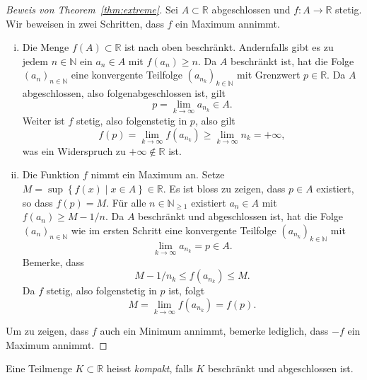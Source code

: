 \documentclass[../main.tex]{subfiles}
\begin{document}
\begin{proof}[Beweis von Theorem~\ref{thm:extreme}]
  Sei $A \subset \mathbb{R}$ abgeschlossen
  und $f \colon A \to \mathbb{R}$ stetig.
  Wir beweisen in zwei Schritten, dass $f$
  ein Maximum annimmt.
  \begin{enumerate}[(i)]
    \item Die Menge $f(A) \subset \mathbb{R}$ ist 
      nach oben beschränkt.
      Andernfalls gibt es zu jedem $n \in \mathbb{N}$ 
      ein $a_n \in A$ mit $f(a_n) \geq n$.
      Da $A$ beschränkt ist, hat
      die Folge ${(a_{n})}_{n \in \mathbb{N}}$ eine
      konvergente Teilfolge
      ${(a_{n_k})}_{k \in \mathbb{N}}$ mit
      Grenzwert $p \in \mathbb{R}$.
      Da $A$ abgeschlossen, also folgenabgeschlossen
      ist, gilt
      \[
        p = \lim_{k \to \infty}a_{n_k} \in A.
      \]
      Weiter ist $f$ stetig, also folgenstetig
      in $p$, also gilt
      \[
        f(p) = \lim_{k \to \infty} f(a_{n_k})
        \geq \lim_{k \to \infty} n_k = +\infty,
      \]
      was ein Widerspruch zu $+\infty \notin \mathbb{R}$ ist.
    \item Die Funktion $f$ nimmt ein Maximum an.
      Setze $
        M = \sup \left\{f(x) \mid x \in A\right\} \in \mathbb{R}
        $.
      Es ist bloss zu zeigen, dass $p \in A$ existiert,
      so dass $f(p) = M$.
      Für alle $n \in \mathbb{N}_{\geq 1}$ existiert
      $a_n \in A$ mit $f(a_n) \geq M - 1/n$.
      Da $A$ beschränkt und abgeschlossen ist,
      hat die Folge
      ${(a_{n})}_{n \in \mathbb{N}}$ wie im
      ersten Schritt eine konvergente
      Teilfolge ${(a_{n_k})}_{k \in \mathbb{N}}$ mit
      \[
        \lim_{k \to \infty} a_{n_k}= p \in A.
      \]
      Bemerke, dass
      \[
        M - 1/n_k \leq f(a_{n_k}) \leq M.
      \]
      Da $f$ stetig, also folgenstetig in $p$ ist, folgt
      \[
        M = \lim_{k \to \infty} f(a_{n_k}) = f(p).
      \]
  \end{enumerate}
  Um zu zeigen, dass $f$ auch ein Minimum annimmt,
  bemerke lediglich, dass $-f$ ein Maximum annimmt.
\end{proof}

\begin{definition}
  Eine Teilmenge $K \subset \mathbb{R}$ heisst
  \emph{kompakt}, falls $K$ 
  beschränkt und abgeschlossen ist.
\end{definition}
\end{document}
